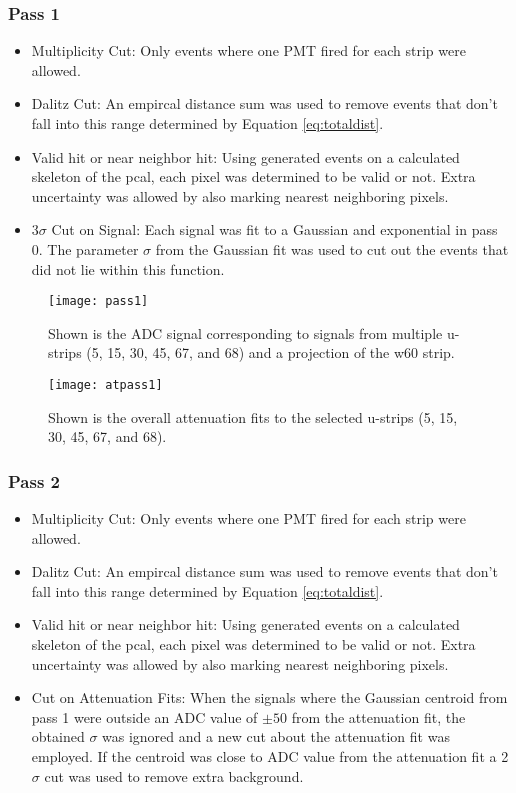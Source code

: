 \clearpage
\FloatBarrier
\subsubsection{Pass 1}
\begin{itemize}
    \item Multiplicity Cut: Only events where one PMT fired for each strip were allowed.
    \item Dalitz Cut: An empircal distance sum was used to remove events that don't fall into this range determined by Equation \ref{eq:totaldist}.
    \item Valid hit or near neighbor hit: Using generated events on a calculated skeleton of the pcal, each pixel was determined to be valid or not. Extra uncertainty was allowed by also marking nearest neighboring pixels.
    \item 3$\sigma$ Cut on Signal: Each signal was fit to a Gaussian and exponential in pass 0. The parameter $\sigma$ from the Gaussian fit was used to cut out the events that did not lie within this function.
\end{itemize}


\begin{figure}[h]
    \centering
    \texttt{[image: pass1]}
    \caption{Shown is the ADC signal corresponding to signals from multiple u-strips (5, 15, 30, 45, 67, and 68) and a projection of the w60 strip.}
    \label{fig:pass1}
\end{figure}

\begin{figure}[h]
    \centering
    \texttt{[image: atpass1]}
    \caption{Shown is the overall attenuation fits to the selected u-strips (5, 15, 30, 45, 67, and 68).}
    \label{fig:atpass1}
\end{figure}



\clearpage
\FloatBarrier
\subsubsection{Pass 2}
\begin{itemize}
    \item Multiplicity Cut: Only events where one PMT fired for each strip were allowed.
    \item Dalitz Cut: An empircal distance sum was used to remove events that don't fall into this range determined by Equation \ref{eq:totaldist}.
    \item Valid hit or near neighbor hit: Using generated events on a calculated skeleton of the pcal, each pixel was determined to be valid or not. Extra uncertainty was allowed by also marking nearest neighboring pixels.
    \item Cut on Attenuation Fits: When the signals where the Gaussian centroid from pass 1 were outside an ADC value of $\pm50$ from the attenuation fit, the obtained $\sigma$ was ignored and a new cut about the attenuation fit was employed. If the centroid was close to ADC value from the attenuation fit a 2$\sigma$ cut was used to remove extra background.
\end{itemize}


